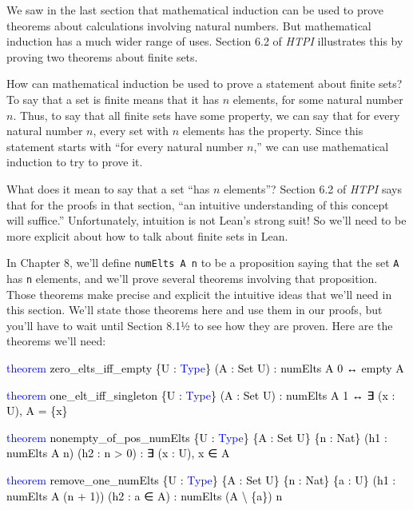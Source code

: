 \documentclass[
  letterpaper,
  DIV=11,
  numbers=noendperiod]{scrreprt}
\newenvironment{Shaded}{\begin{snugshade}}{\end{snugshade}}
\newcommand{\KeywordTok}[1]{\textcolor[rgb]{0.00,0.23,0.31}{#1}}
\newcommand{\NormalTok}[1]{\textcolor[rgb]{0.00,0.23,0.31}{#1}}
\renewcommand{\NormalTok}[1]{\textcolor[HTML]{000000}{#1}}
\renewcommand{\KeywordTok}[1]{\textcolor[HTML]{0000FF}{#1}}
\theoremstyle{remark}
\begin{document}
We saw in the last section that mathematical induction can be used to
prove theorems about calculations involving natural numbers. But
mathematical induction has a much wider range of uses. Section 6.2 of
\emph{HTPI} illustrates this by proving two theorems about finite sets.

How can mathematical induction be used to prove a statement about finite
sets? To say that a set is finite means that it has \(n\) elements, for
some natural number \(n\). Thus, to say that all finite sets have some
property, we can say that for every natural number \(n\), every set with
\(n\) elements has the property. Since this statement starts with ``for
every natural number \(n\),'' we can use mathematical induction to try
to prove it.

What does it mean to say that a set ``has \(n\) elements''? Section 6.2
of \emph{HTPI} says that for the proofs in that section, ``an intuitive
understanding of this concept will suffice.'' Unfortunately, intuition
is not Lean's strong suit! So we'll need to be more explicit about how
to talk about finite sets in Lean.

In Chapter 8, we'll define \texttt{numElts\ A\ n} to be a proposition
saying that the set \texttt{A} has \texttt{n} elements, and we'll prove
several theorems involving that proposition. Those theorems make precise
and explicit the intuitive ideas that we'll need in this section. We'll
state those theorems here and use them in our proofs, but you'll have to
wait until Section 8.1½ to see how they are proven. Here are the
theorems we'll need:

\begin{Shaded}
\begin{Highlighting}[]
\KeywordTok{theorem}\NormalTok{ zero\_elts\_iff\_empty \{U : }\KeywordTok{Type}\NormalTok{\} (A : Set U) :}
\NormalTok{    numElts A 0 ↔ empty A}

\KeywordTok{theorem}\NormalTok{ one\_elt\_iff\_singleton \{U : }\KeywordTok{Type}\NormalTok{\} (A : Set U) :}
\NormalTok{    numElts A 1 ↔ ∃ (x : U), A = \{x\}}

\KeywordTok{theorem}\NormalTok{ nonempty\_of\_pos\_numElts \{U : }\KeywordTok{Type}\NormalTok{\} \{A : Set U\} \{n : Nat\}}
\NormalTok{    (h1 : numElts A n) (h2 : n \textgreater{} 0) : ∃ (x : U), x ∈ A}

\KeywordTok{theorem}\NormalTok{ remove\_one\_numElts \{U : }\KeywordTok{Type}\NormalTok{\} \{A : Set U\} \{n : Nat\} \{a : U\}}
\NormalTok{    (h1 : numElts A (n + 1)) (h2 : a ∈ A) : numElts (A \textbackslash{} \{a\}) n}
\end{Highlighting}
\end{Shaded}
\end{document}
